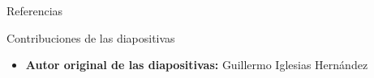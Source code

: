 
\begin{frame}[allowframebreaks]{Referencias}
    
    
\end{frame}

\begin{frame}{Contribuciones de las diapositivas}
\begin{itemize}
    \item \textbf{Autor original de las diapositivas:} Guillermo Iglesias Hernández
\end{itemize}
\end{frame}

